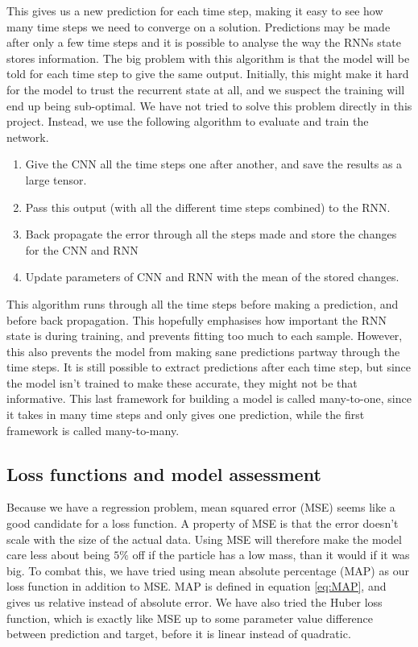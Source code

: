 \documentclass[a4paper]{article}
\begin{document}
This gives us a new prediction for each time step, making it easy to see how many time steps we need to converge on a solution. Predictions may be made after only a few time steps and it is possible to analyse the way the RNNs state stores information. The big problem with this algorithm is that the model will be told for each time step to give the same output. Initially, this might make it hard for the model to trust the recurrent state at all, and we suspect the training will end up being sub-optimal. We have not tried to solve this problem directly in this project. Instead, we use the following algorithm to evaluate and train the network.

\begin{enumerate}
    \item Give the CNN all the time steps one after another, and save the results as a large tensor.
    \item Pass this output (with all the different time steps combined) to the RNN.
    \item Back propagate the error through all the steps made and store the changes for the CNN and RNN
    \item Update parameters of CNN and RNN with the mean of the stored changes.
\end{enumerate}

This algorithm runs through all the time steps before making a prediction, and before back propagation. This hopefully emphasises how important the RNN state is during training, and prevents fitting too much to each sample. However, this also prevents the model from making sane predictions partway through the time steps. It is still possible to extract predictions after each time step, but since the model isn't trained to make these accurate, they might not be that informative. This last framework for building a model is called many-to-one, since it takes in many time steps and only gives one prediction, while the first framework is called many-to-many.

\subsection{Loss functions and model assessment}
\label{subsec:loss_theory}
Because we have a regression problem, mean squared error (MSE) seems like a good candidate for a loss function. A property of MSE is that the error doesn't scale with the size of the actual data. Using MSE will therefore make the model care less about being $5\%$ off if the particle has a low mass, than it would if it was big. To combat this, we have tried using mean absolute percentage (MAP) as our loss function in addition to MSE. MAP is defined in equation \ref{eq:MAP}, and gives us relative instead of absolute error. We have also tried the Huber loss function, which is exactly like MSE up to some parameter value difference between prediction and target, before it is linear instead of quadratic.
\end{document}
